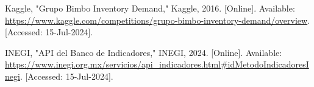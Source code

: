 \documentclass[letterpaper, 10 pt, conference]{ieeeconf}  %
\begin{document}



\begin{thebibliography}{99}

 Kaggle, "Grupo Bimbo Inventory Demand," Kaggle, 2016. [Online]. Available: \url{https://www.kaggle.com/competitions/grupo-bimbo-inventory-demand/overview}. [Accessed: 15-Jul-2024].

 INEGI, "API del Banco de Indicadores," INEGI, 2024. [Online]. Available: \url{https://www.inegi.org.mx/servicios/api_indicadores.html#idMetodoIndicadoresInegi}. [Accessed: 15-Jul-2024].

\end{thebibliography}
\end{document}

